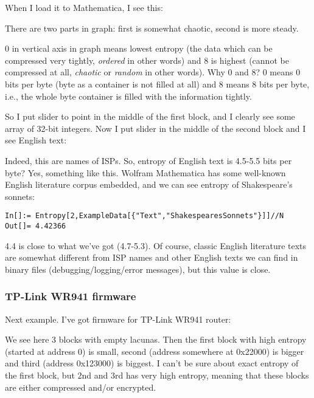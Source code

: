 When I load it to Mathematica, I see this:



There are two parts in graph: first is somewhat chaotic, second is more steady.

0 in vertical axis in graph means lowest entropy
(the data which can be compressed very tightly, \emph{ordered} in other words) 
and 8 is highest (cannot be compressed at all, \emph{chaotic} or \emph{random} in other words).
Why 0 and 8? 0 means 0 bits per byte (byte as a container is not filled at all) 
and 8 means 8 bits per byte, i.e., the whole byte container is filled with the information tightly.

So I put slider to point in the middle of the first block, and I clearly see some array of 32-bit integers.
Now I put slider in the middle of the second block and I see English text:



Indeed, this are names of ISPs.
So, entropy of English text is 4.5-5.5 bits per byte? Yes, something like this.
Wolfram Mathematica has some well-known English literature corpus embedded, and we can see entropy of Shakespeare's sonnets:

\begin{lstlisting}[style=custommath]
In[]:= Entropy[2,ExampleData[{"Text","ShakespearesSonnets"}]]//N
Out[]= 4.42366
\end{lstlisting}

4.4 is close to what we've got (4.7-5.3). 
Of course, classic English literature texts are somewhat different from ISP names and other
English texts we can find in binary files 
(debugging/logging/error messages), but this value is close.

\subsubsection{TP-Link WR941 firmware}

Next example. I've got firmware for TP-Link WR941 router:



We see here 3 blocks with empty lacunas.
Then the first block with high entropy (started at address 0) is small, second (address somewhere at 0x22000) is bigger and third (address 0x123000) is biggest.
I can't be sure about exact entropy of the first block, but 2nd and 3rd has very high entropy, meaning that these blocks are either
compressed and/or encrypted.

